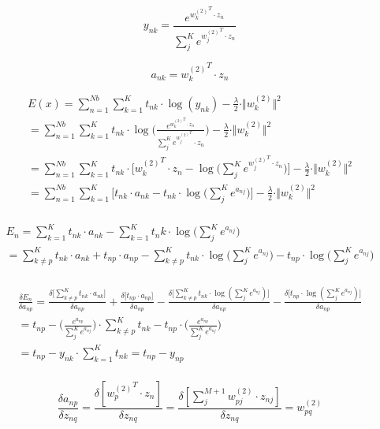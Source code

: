 \documentclass[12pt]{article}
\begin{document}
$$
y_{nk}=\frac{e^{{{w_k^{(2)}}^T}\cdot z_n}}{\sum_{j}^{K}e^{{{w_j^{(2)}}^T}\cdot z_n}}
$$

$$
a_{nk}= {w_k^{(2)}}^T \cdot z_n
$$

\begin{multline}
E(x)= \sum_{n=1}^{Nb}\sum_{k=1}^{K}t_{nk}\cdot \log(y_{nk}) - \frac{\lambda}{2} \cdot \Vert w_k^{(2)}\Vert^2 \\
=\sum_{n=1}^{Nb}\sum_{k=1}^{K}t_{nk}\cdot \log\bigg(\frac{e^{{w_k^{(2)}}^T\cdot z_n}}{\sum_{j}^{K}e^{{w_j^{(2)}}^T}\cdot z_n}\bigg) - \frac{\lambda}{2} \cdot \Vert w_k^{(2)}\Vert^2 \\
=\sum_{n=1}^{Nb}\sum_{k=1}^{K} t_{nk} \cdot \big[{w_k^{(2)}}^T \cdot z_n - \log\big(\sum_{j}^{K}e^{{w_j^{(2)}}^T\cdot z_n} \big)\big] - \frac{\lambda}{2} \cdot \Vert w_k^{(2)}\Vert^2 \\
=\sum_{n=1}^{Nb}\sum_{k=1}^{K} \big[ t_{nk} \cdot a_{nk} - t_{nk} \cdot \log\big( \sum_{j}^{K}e^{a_{nj}} \big) \big] - \frac{\lambda}{2} \cdot \Vert w_k^{(2)}\Vert^2 \\
\end{multline}


\begin{multline}
E_n=\sum_{k=1}^{K}t_{nk} \cdot a_{nk} -\sum_{k=1}^{K} t_nk \cdot \log \big(\sum_{j}^{K}e^{a_{nj}}\big) \\
=\sum_{k\neq p}^K t_{nk} \cdot a_{nk} + t_{np} \cdot a_{np} - \sum_{k\neq p}^K t_{nk} \cdot \log \big( \sum_j^K e^{a_{nj}}\big) - t_{np} \cdot \log \big( \sum_j^K e^{a_{nj}} \big)\\
\end{multline}


\begin{multline}
\frac{\delta E_n}{\delta a_{np}}=\frac{\delta\big[ \sum_{k\neq p}^K t_{nk} \cdot a_{nk}  \big]}{\delta a_{np}} + \frac{\delta \big[t_{np} \cdot a_{np}\big]}{\delta a_{np}} - \frac{\delta \big [ \sum_{k\neq p}^K t_{nk} \cdot \log (\sum_j^Ke^{a_{nj}}) \big]}{\delta a_{np}} - \frac{\delta \big [ t_{np} \cdot \log (\sum_j^Ke^{a_{nj}}) \big]}{\delta a_{np}} \\
= t_{np} - \Big(\frac{e^{a_{np}}}{\sum_{j}^{K}e^{a_{nj}}}\Big) \cdot \sum_{k\neq p}^K t_{nk} - t_{np} \cdot \Big( \frac{e^{a_{np}}}{\sum_j^Ke^{a_{nj}}} \Big) \\
= t_{np} - y_{nk} \cdot \sum_{k=1}^K t_{nk} = t_{np} - y_{np} \\
\end{multline}


$$
\frac{\delta a_{np}}{\delta z_{nq}} = \frac{\delta[{w_{p}^{(2)}}^T \cdot z_{n}]}{\delta z_{nq}} = \frac {\delta [\sum_j^{M+1}w_{pj}^{(2)} \cdot z_{nj}]}{\delta z_{nq}} = w_{pq}^{(2)}
$$
\end{document}
